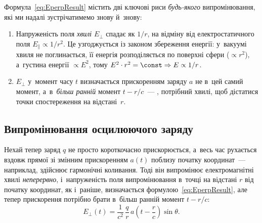 Формула~\eqref{eq:EperpResult} містить дві ключові риси \emph{будь-якого} випромінювання,
які ми надалі зустрічатимемо знову й~знову:
\begin{enumerate}
	\item Напруженість поля \emph{хвилі} $E_\perp$ спадає як $1/r$, на відміну від
	  електростатичного поля $E_\parallel\propto1/r^2$. Це узгоджується із законом
	  збереження енергії: у~вакуумі хвиля не поглинається, її енергія розподіляється по поверхні сфери ($\propto r^2$),
	  а~густина енергії $\propto E^2$, тому $E^2\cdot r^2 = \const \Rightarrow
	  E\propto1/r$.
	\item $E_\perp$ у~момент часу $t$ визначається прискоренням заряду $a$ не в~цей самий
	  момент, а~в~\emph{більш ранній} момент $t-r/c$~--- ,
	  потрібний хвилі, щоб дістатися точки спостереження на відстані~$r$.
\end{enumerate}



\subsection*{Випромінювання осцилюючого заряду}



Нехай тепер заряд $q$ не просто короткочасно прискорюється, а~весь час рухається вздовж
прямої зі змінним прискоренням $a(t)$ поблизу початку координат~--- наприклад, здійснює
гармонічні коливання. Тоді він випромінює електромагнітні хвилі \emph{неперервно},
і~напруженість поля випромінювання в~точці на відстані $r$ від початку координат, як
і~раніше, визначається формулою~\eqref{eq:EperpResult}, але тепер прискорення потрібно
брати в~більш ранній момент $t-r/c$:
\begin{equation}\label{eq:OscillatingChargeE}
	E_\perp(t) = \frac{1}{c^2}\,\frac{q}{r}\,a\!\left(t-\frac{r}{c}\right)\sin\theta.
\end{equation}

